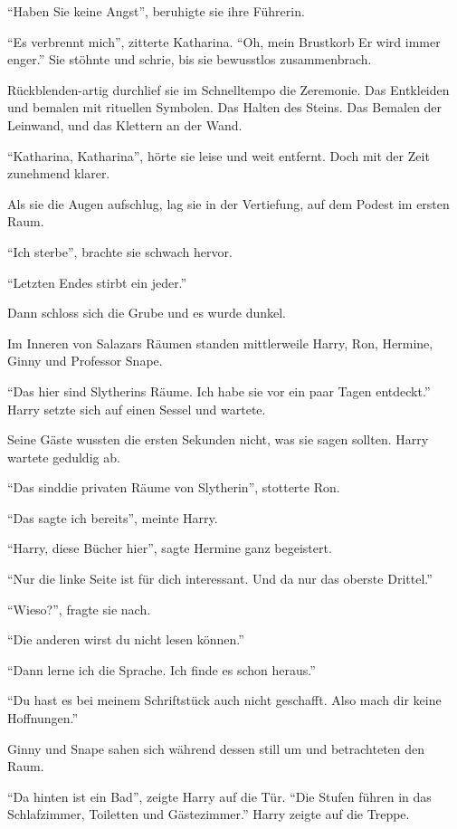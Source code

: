 \enquote{Haben Sie keine Angst}, beruhigte sie ihre Führerin.

\enquote{Es verbrennt mich}, zitterte Katharina. \enquote{Oh, mein Brustkorb \gst Er wird immer enger.} Sie stöhnte und schrie, bis sie bewusstlos zusammenbrach.

Rückblenden-artig durchlief sie im Schnelltempo die Zeremonie. Das Entkleiden und bemalen mit rituellen Symbolen. Das Halten des Steins. Das Bemalen der Leinwand, und das Klettern an der Wand.

\enquote{Katharina, \gst Katharina}, hörte sie leise und weit entfernt. Doch mit der Zeit zunehmend klarer.

Als sie die Augen aufschlug, lag sie in der Vertiefung, auf dem Podest im ersten Raum.

\enquote{Ich sterbe}, brachte sie schwach hervor.

\enquote{Letzten Endes stirbt ein jeder.}

Dann schloss sich die Grube und es wurde dunkel.

\trenn

Im Inneren von Salazars Räumen standen mittlerweile Harry, Ron, Hermine, Ginny und Professor Snape.

\enquote{Das hier sind Slytherins Räume. Ich habe sie vor ein paar Tagen entdeckt.} Harry setzte sich auf einen Sessel und wartete.

Seine Gäste wussten die ersten Sekunden nicht, was sie sagen sollten. Harry wartete geduldig ab.

\enquote{Das sind\abs die privaten Räume von Slytherin}, stotterte Ron.

\enquote{Das sagte ich bereits}, meinte Harry.

\enquote{Harry, diese Bücher hier\abs}, sagte Hermine ganz begeistert.

\enquote{Nur die linke Seite ist für dich interessant. Und da nur das oberste Drittel.}

\enquote{Wieso?}, fragte sie nach.

\enquote{Die anderen wirst du nicht lesen können.}

\enquote{Dann lerne ich die Sprache. Ich finde es schon heraus.}

\enquote{Du hast es bei meinem Schriftstück auch nicht geschafft. Also mach dir keine Hoffnungen.}

Ginny und Snape sahen sich während dessen still um und betrachteten den Raum.

\enquote{Da hinten ist ein Bad}, zeigte Harry auf die Tür. \enquote{Die Stufen führen in das Schlafzimmer, Toiletten und Gästezimmer.} Harry zeigte auf die Treppe.

